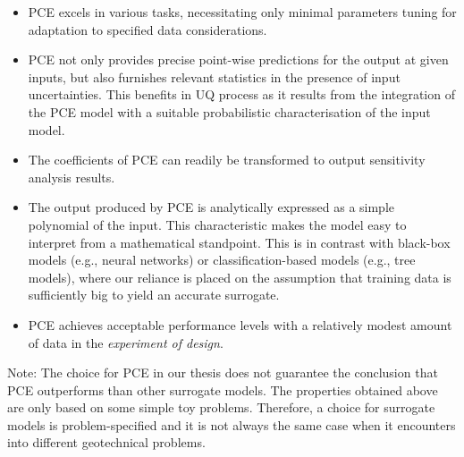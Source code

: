 \begin{itemize}[left=0pt]
    \item \acrshort{PCE} excels in various tasks, necessitating only minimal parameters tuning for adaptation to specified data considerations.
    \item \acrshort{PCE} not only provides precise point-wise predictions for the output at given inputs, but also furnishes relevant statistics in the presence of input uncertainties. This benefits in UQ process as it results from the integration of the \acrshort{PCE} model with a suitable probabilistic characterisation of the input model.
    \item The coefficients of \acrshort{PCE} can readily be transformed to output sensitivity analysis results.
    \item The output produced by \acrshort{PCE} is analytically expressed as a simple polynomial of the input. This characteristic makes the model easy to interpret from a mathematical standpoint. This is in contrast with black-box models (e.g., neural networks) or classification-based models (e.g., tree models), where our reliance is placed on the assumption that training data is sufficiently big to yield an accurate surrogate.
    \item \acrshort{PCE} achieves acceptable performance levels with a relatively 
    modest amount of data in the \textit{experiment of design}.
\end{itemize}
Note: The choice for \acrshort{PCE} in our thesis does not guarantee the conclusion that \acrshort{PCE} outperforms than other surrogate models. The properties obtained above are only based on some simple toy problems. Therefore, a choice for surrogate models is problem-specified and it is not always the same case when it encounters into different geotechnical problems.


